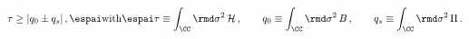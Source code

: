 \begin{equation}
\tau \geq |q_0 \pm  q_s|\,, \espai \textrm{with} \espai \tau\equiv
\int_{\CC} {\rmd \sigma^2} \, \mathcal{H} \,,\qquad
q_0 \equiv \int_{\CC} {\rmd \sigma^2}\, B \,, \qquad
q_s \equiv \int_{\CC} {\rmd \sigma^2} \, \Pi \,.
\end{equation}

